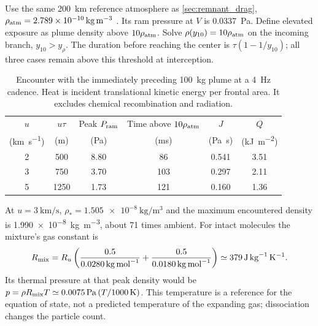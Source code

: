 \documentclass{article}
\begin{document}
Use the same \SI{200}{\kilo\meter} reference atmosphere as \autoref{sec:remnant_drag}, $\rho_{\rm atm}=\SI{2.789e-10}{\kilogram\per\cubic\meter}$ \cite{vallado_atmosexp}. Its ram pressure at $V$ is \SI{0.0337}{\pascal}. Define elevated exposure as plume density above $10\rho_{\rm atm}$. Solve $\rho(y_{10})=10\rho_{\rm atm}$ on the incoming branch, $y_{10}>y_\rho$. The duration before reaching the center is $\tau(1-1/y_{10})$; all three cases remain above this threshold at interception.

\begin{table}[!htpb]
    \centering
    \caption{Encounter with the immediately preceding \SI{100}{\kilogram} plume at a \SI{4}{\hertz} cadence. Heat is incident translational kinetic energy per frontal area. It excludes chemical recombination and radiation.}
    \label{tab:leo_plume_loads}
    \begin{tabular}{|c|c|c|c|c|c|}
        \hline
        $u$ & $u\tau$ & Peak $P_{\rm ram}$ & Time above $10\rho_{\rm atm}$ & $J$ & $Q$ \\
        (\si{\kilo\meter\per\second}) & (\si{\meter}) & (\si{\pascal}) & (\si{\milli\second}) & (\si{\pascal\second}) & (\si{\kilo\joule\per\square\meter}) \\\hline
        2 & 500 & 8.80 & 86 & 0.541 & 3.51 \\\hline
        3 & 750 & 3.70 & 103 & 0.297 & 2.11 \\\hline
        5 & 1250 & 1.73 & 121 & 0.160 & 1.36 \\\hline
    \end{tabular}
\end{table}

At $u=\SI{3}{\kilo\meter\per\second}$, $\rho_*=\SI{1.505e-8}{\kilogram\per\cubic\meter}$ and the maximum encountered density is \SI{1.990e-8}{\kilogram\per\cubic\meter}, about 71 times ambient. For intact molecules the mixture's gas constant is
\begin{equation}
R_{\rm mix}=R_u\left(\frac{0.5}{\SI{0.0280}{\kilogram\per\mole}}+
\frac{0.5}{\SI{0.0180}{\kilogram\per\mole}}\right)
\simeq\SI{379}{\joule\per\kilogram\per\kelvin}.
\end{equation}
Its thermal pressure at that peak density would be $p=\rho R_{\rm mix}T\simeq\SI{0.0075}{\pascal}\,(T/\SI{1000}{\kelvin})$. This temperature is a reference for the equation of state, not a predicted temperature of the expanding gas; dissociation changes the particle count.
\end{document}
